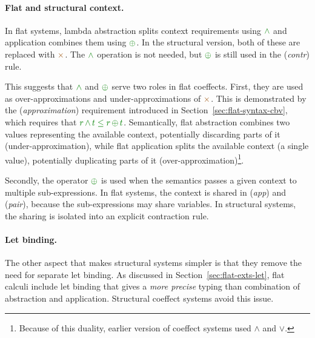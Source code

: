 \paragraph{Flat and structural context.} In flat systems, lambda abstraction splits context
requirements using $\czip$ and application combines them using $\cpar$. In the structural
version, both of these are replaced with $\atimes$. The $\czip$ operation is not needed, but
$\cpar$ is still used in the (\emph{contr}) rule.

This suggests that $\czip$ and $\cpar$ serve two roles in flat coeffects. First, they are used
as over-approximations and under-approximations of $\atimes$. This is demonstrated by the
(\emph{approximation}) requirement introduced in Section~\ref{sec:flat-syntax-cbv}, which requires that
$\cclrd{r}\,\czip\,\cclrd{t}\;\cleq\;\cclrd{r}\,\cpar\,\cclrd{t}$. Semantically, flat abstraction
combines two values representing the available context, potentially discarding parts of it
(under-approximation), while flat application splits the available context (a single value),
potentially duplicating parts of it (over-approxi\-mation)\footnote{Because of this duality, earlier
version of coeffect systems \cite{coeffects-icalp13} used $\wedge$ and $\vee$.}.

Secondly, the operator $\cpar$ is used when the semantics passes a given context to multiple
sub-expressions. In flat systems, the context is shared in (\emph{app}) and (\emph{pair}), because
the sub-expressions may share variables. In structural systems, the sharing is isolated into an
explicit contraction rule.

\paragraph{Let binding.}
The other aspect that makes structural systems simpler is that they remove the need for
separate let binding. As discussed in Section~\ref{sec:flat-exts-let}, flat calculi include
let binding that gives a \emph{more precise} typing than combination of abstraction and
application. Structural coeffect systems avoid this issue.

